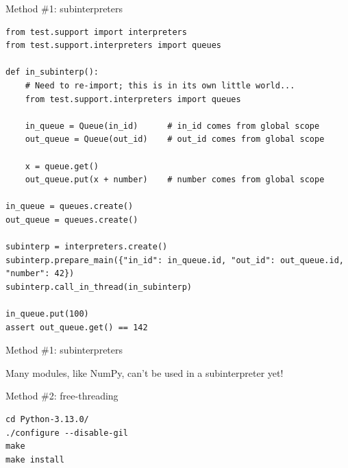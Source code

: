 \documentclass[aspectratio=169]{beamer}
\begin{document}
\begin{frame}[fragile]{Method \#1: subinterpreters}
\vspace{0.35 cm}
\scriptsize
\begin{verbatim}
from test.support import interpreters
from test.support.interpreters import queues

def in_subinterp():
    # Need to re-import; this is in its own little world...
    from test.support.interpreters import queues

    in_queue = Queue(in_id)      # in_id comes from global scope
    out_queue = Queue(out_id)    # out_id comes from global scope

    x = queue.get()
    out_queue.put(x + number)    # number comes from global scope

in_queue = queues.create()
out_queue = queues.create()

subinterp = interpreters.create()
subinterp.prepare_main({"in_id": in_queue.id, "out_id": out_queue.id, "number": 42})
subinterp.call_in_thread(in_subinterp)

in_queue.put(100)
assert out_queue.get() == 142
\end{verbatim}
\end{frame}

\begin{frame}{Method \#1: subinterpreters}
\Large

\begin{center}
Many modules, like NumPy, can't be used in a subinterpreter yet!
\end{center}
\end{frame}

\begin{frame}[fragile]{Method \#2: free-threading}
\vspace{1 cm}
\large

\begin{verbatim}
cd Python-3.13.0/
./configure --disable-gil
make
make install
\end{verbatim}

\vspace{1 cm}

\vspace{0.25 cm}
\end{frame}
\end{document}
